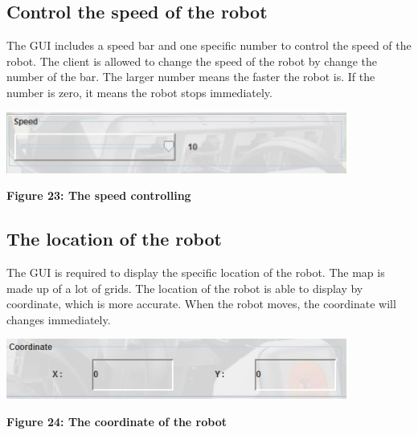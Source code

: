 \documentclass[11pt, a4paper]{report}
\begin{document}
\subsection{Control the speed of the robot}
The GUI includes a speed bar and one specific number to control the speed of the robot. The client is allowed to change the speed of the robot by change the number of the bar. The larger number means the faster the robot is. If the number is zero, it means the robot stops immediately.
  \begin{center}
 \includegraphics[width=11.20cm]{bar}
\end{center}
\begin{center}
\textbf {Figure 23: The speed controlling} \\[0.3cm]
\end{center}
\subsection{The location of the robot}
The GUI is required to display the specific location of the robot. The map is made up of a lot of grids. The location of the robot is able to display by coordinate, which is more accurate. When the robot moves, the coordinate will changes immediately.
   \begin{center}
 \includegraphics[width=11.20cm]{RobotCoordinate.jpg}
\end{center}
\begin{center}
\textbf {Figure 24: The coordinate of the robot} \\[0.3cm]
\end{center}


\end{document}
